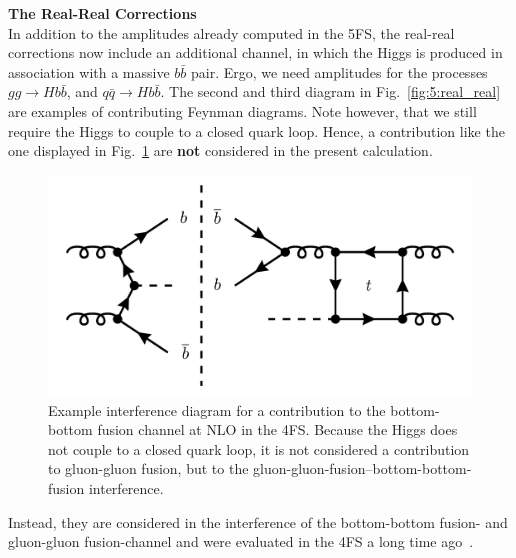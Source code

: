 \textbf{The Real-Real Corrections} \\
In addition to the amplitudes already computed in the 5\acs{FS}, the real-real corrections now include an additional channel, in which the Higgs is produced in association with a massive $b \bar{b}$ pair. Ergo, we need amplitudes for the processes $gg \longrightarrow H b \bar{b}$, and $q \bar{q} \longrightarrow H b \bar{b}$. The second and third diagram in Fig.~\ref{fig:5:real_real} are examples of contributing Feynman diagrams. Note however, that we still require the Higgs to couple to a closed quark loop. Hence, a contribution like the one displayed in Fig.~\ref{fig:5:ggH_bbH_interference} are \textbf{not} considered in the present calculation.
\begin{figure}[h]
\centering
\includegraphics[scale=0.3]{Images/NNLO_Feynman_diagrams/interference_with_bbH.pdf}
\caption{Example interference diagram for a contribution to the bottom-bottom fusion channel at \acs{NLO} in the 4\acs{FS}. Because the Higgs does not couple to a closed quark loop, it is not considered a contribution to gluon-gluon fusion, but to the gluon-gluon-fusion--bottom-bottom-fusion interference.}
\label{fig:5:ggH_bbH_interference}
\end{figure}
Instead, they are considered in the interference of the bottom-bottom fusion- and gluon-gluon fusion-channel and were evaluated in the 4\acs{FS} a long time ago~\cite{Dittmaier:2003ej}.

